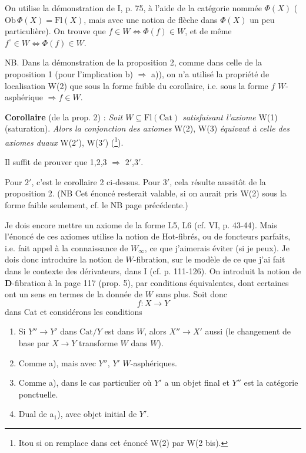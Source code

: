 \documentclass[11pt]{article}
\newcommand{\printedpage}[1]{\marginpar{\footnotesize p.~#1}}
\newcommand{\msp}[1]{\marginpar{\footnotesize [#1]}}
\begin{document}
\printedpage{4}
On utilise la démonstration de I, p. 75, à l'aide de la catégorie nommée $\Phi(X)$ ($\mathrm{Ob}\,\Phi(X) = \mathrm{Fl}(X)$, mais avec une notion de flèche dans $\Phi(X)$ un peu particulière). On trouve que $f \in W \iff \Phi(f) \in W$, et de même $f^\circ \in W \iff \Phi(f) \in W$.

NB. Dans la démonstration de la proposition 2, comme dans celle de la proposition 1 (pour l'implication b) $\Longrightarrow$ a)), on n'a utilisé la propriété de localisation W(2) que sous la forme faible du corollaire, i.e. sous la forme $f$ $W$-asphérique $\Longrightarrow f \in W$.

\textbf{Corollaire} (de la prop. 2) : \textit{Soit $W \subseteq \mathrm{Fl}(\mathrm{Cat})$ satisfaisant l'axiome} W(1) (saturation). \textit{Alors la conjonction des axiomes} W(2), W(3) \textit{équivaut à celle des axiomes duaux} W($2'$), W($3'$) (\footnote[5]{Itou si on remplace dans cet énoncé W(2) par W(2 bis).}).

Il suffit de prouver que 1,2,3 $\Longrightarrow$ $2'$,$3'$.

\msp{page 4}

Pour $2'$, c'est le corollaire 2 ci-dessus. Pour $3'$, cela résulte aussitôt de la proposition 2. (NB Cet énoncé resterait valable, si on aurait pris W(2) sous la forme faible seulement, cf. le NB page précédente.)

Je dois encore mettre un axiome de la forme L5, L6 (cf. VI, p. 43-44). Mais l'énoncé de ces axiomes utilise la notion de Hot-fibrés, ou de foncteurs parfaits, i.e. fait appel à la connaissance de $W_\infty$, ce que j'aimerais éviter (si je peux). Je dois donc introduire la notion de $W$-fibration, sur le modèle de ce que j'ai fait dans le contexte des dérivateurs, dans I (cf. p. 111-126). On introduit la notion de \textbf{D}-fibration à la page 117 (prop. 5), par conditions équivalentes, dont certaines ont un sens en termes de la donnée de $W$ sans plus. Soit donc
\[ f : X \longrightarrow Y \]
dans Cat et considérons les conditions

\begin{enumerate}
\item[a)] Si $Y'' \longrightarrow Y'$ dans $\mathrm{Cat}/Y$ est dans $W$, alors $X'' \longrightarrow X'$ aussi (le changement de base par $X \longrightarrow Y$ transforme $W$ dans $W$).
\item[a$'$)] Comme a), mais avec $Y''$, $Y'$ $W$-asphériques.
\item[a$_1$)] Comme a), dans le cas particulier où $Y'$ a un objet final et $Y''$ est la catégorie ponctuelle.
\item[a$_2$)] Dual de a$_1$), avec objet initial de $Y'$.
\end{enumerate}
\end{document}
